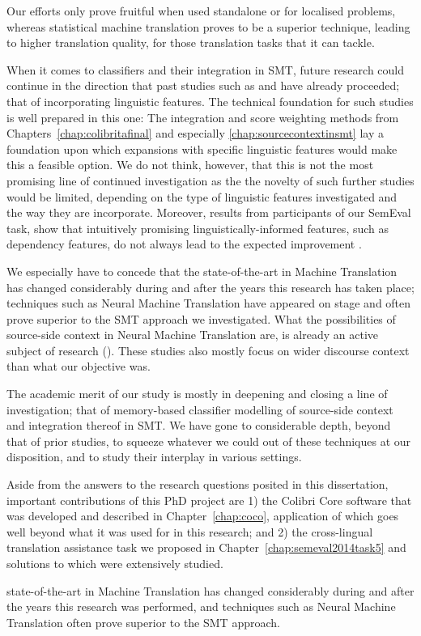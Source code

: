 Our efforts only prove fruitful when used standalone or for localised problems,
whereas statistical machine translation proves to be a superior technique,
leading to higher translation quality, for those translation tasks that it can
tackle.

When it comes to classifiers and their integration in SMT, future research could continue in the direction that
past studies such as \cite{Rejwanul+11} and \cite{Stroppa+07}  have already proceeded; that of incorporating linguistic
features. The technical foundation for such studies is well prepared in this one: The integration and score weighting methods from Chapters~\ref{chap:colibritafinal} and especially
\ref{chap:sourcecontextinsmt} lay a foundation upon which expansions with specific linguistic features would make this a
feasible option. We do not think, however, that this is not the most promising line of continued investigation as the
the novelty of such further studies would be limited, depending on the type of linguistic features
investigated and the way they are incorporate. Moreover, results from participants of our SemEval task, show
that intuitively promising linguistically-informed features, such as dependency features, do not always lead to the
expected improvement \citep{UNAL,IUCL}.

We especially have to concede that the state-of-the-art in Machine Translation has changed considerably during and after
the years this research has taken place; techniques such as Neural Machine Translation have appeared on stage and often
prove superior to the SMT approach we investigated. What the possibilities of source-side context in Neural Machine
Translation are, is already an active subject of research (\citep{Jean+17,Wang+17,Bawden+17,Maruf+17}). These studies
also mostly focus on wider discourse context than what our objective was.

The academic merit of our study is mostly in deepening and closing a line of investigation; that of memory-based classifier modelling of
source-side context and integration thereof in SMT. We have gone to considerable depth, beyond that of prior studies, to
squeeze whatever we could out of these techniques at our disposition, and to study their interplay in various settings.

Aside from the answers to the research questions posited in this dissertation, important contributions of this PhD
project are 1) the Colibri Core software that was developed and described in Chapter~\ref{chap:coco}, application of
which goes well beyond what it was used for in this research; and 2) the cross-lingual translation assistance task we
proposed in Chapter~\ref{chap:semeval2014task5} and solutions to which were extensively studied.





state-of-the-art in Machine Translation has changed considerably during and after the years this research was
performed, and techniques such as Neural Machine Translation often prove superior to the SMT approach.







